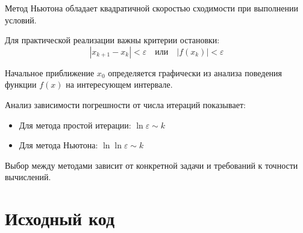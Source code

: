 Метод Ньютона обладает квадратичной скоростью сходимости при выполнении условий.

Для практической реализации важны критерии остановки:
\begin{equation}
|x_{k+1} - x_k| < \varepsilon \quad \text{или} \quad |f(x_k)| < \varepsilon
\end{equation}

Начальное приближение $x_0$ определяется графически из анализа поведения функции $f(x)$ на интересующем интервале.

Анализ зависимости погрешности от числа итераций показывает:
\begin{itemize}
\item Для метода простой итерации: $\ln\varepsilon \sim k$
\item Для метода Ньютона: $\ln\ln\varepsilon \sim k$
\end{itemize}

Выбор между методами зависит от конкретной задачи и требований к точности вычислений.

\section*{Исходный код}

